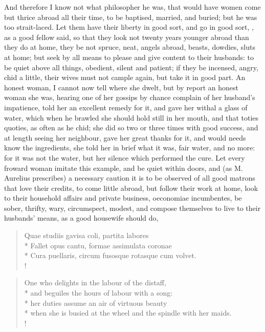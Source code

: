 And therefore I know not what philosopher he was, that would have women
come but thrice abroad all their time, to be baptised, married,
and buried; but he was too strait-laced. Let them have their liberty in
good sort, and go in good sort, , as a good fellow said, so that they look not twenty
years younger abroad than they do at home, they be not spruce, neat,
angels abroad, beasts, dowdies, sluts at home; but seek by all means to
please and give content to their husbands: to be quiet above all
things, obedient, silent and patient; if they be incensed, angry, chid
a little, their wives must not cample again, but take it in good
part. An honest woman, I cannot now tell where she dwelt, but by report
an honest woman she was, hearing one of her gossips by chance complain
of her husband's impatience, told her an excellent remedy for it, and
gave her withal a glass of water, which when he brawled she should hold
still in her mouth, and that toties quoties, as often as he chid; she
did so two or three times with good success, and at length seeing her
neighbour, gave her great thanks for it, and would needs know the
ingredients, she told her in brief what it was, fair water, and
no more: for it was not the water, but her silence which performed the
cure. Let every froward woman imitate this example, and be quiet within
doors, and (as M. Aurelius prescribes) a necessary caution it is
to be observed of all good matrons that love their credits, to come
little abroad, but follow their work at home, look to their household
affairs and private business, oeconomiae incumbentes, be sober,
thrifty, wary, circumspect, modest, and compose themselves to live to
their husbands' means, as a good housewife should do,
%
\begin{latin}%
\begin{verse}%
Quae studiis gavisa coli, partita labores\\*
Fallet opus cantu, formae assimulata coronae\\*
Cura puellaris, circum fusosque rotasque cum volvet.\\!
\end{verse}%
\end{latin}%
\translationrule%
\begin{verse}%
One who delights in the labour of the distaff,\\*
and beguiles the hours of labour with a song:\\*
her duties assume an air of virtuous beauty\\*
when she is busied at the wheel and the spindle with her maids.\\!
\end{verse}
%

